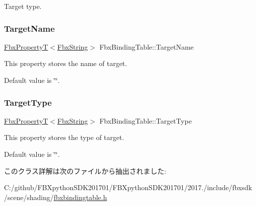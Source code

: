 Target type. 

\mbox{\label{class_fbx_binding_table_a09ebb43f4fdfafcf1842ecad60b16801}} 
\subsubsection{\texorpdfstring{Target\+Name}{TargetName}}
{\footnotesize\ttfamily \hyperlink{class_fbx_property_t}{Fbx\+PropertyT}$<$\hyperlink{class_fbx_string}{Fbx\+String}$>$ Fbx\+Binding\+Table\+::\+Target\+Name}

This property stores the name of target.

Default value is \char`\"{}\char`\"{}. \mbox{\label{class_fbx_binding_table_aca964aac5ddc2238ca9d4a3cafe42486}} 
\subsubsection{\texorpdfstring{Target\+Type}{TargetType}}
{\footnotesize\ttfamily \hyperlink{class_fbx_property_t}{Fbx\+PropertyT}$<$\hyperlink{class_fbx_string}{Fbx\+String}$>$ Fbx\+Binding\+Table\+::\+Target\+Type}

This property stores the type of target.

Default value is \char`\"{}\char`\"{}. 

このクラス詳解は次のファイルから抽出されました\+:\begin{DoxyCompactItemize}
\item 
C\+:/github/\+F\+B\+Xpython\+S\+D\+K201701/\+F\+B\+Xpython\+S\+D\+K201701/2017./include/fbxsdk/scene/shading/\hyperlink{fbxbindingtable_8h}{fbxbindingtable.\+h}\end{DoxyCompactItemize}
